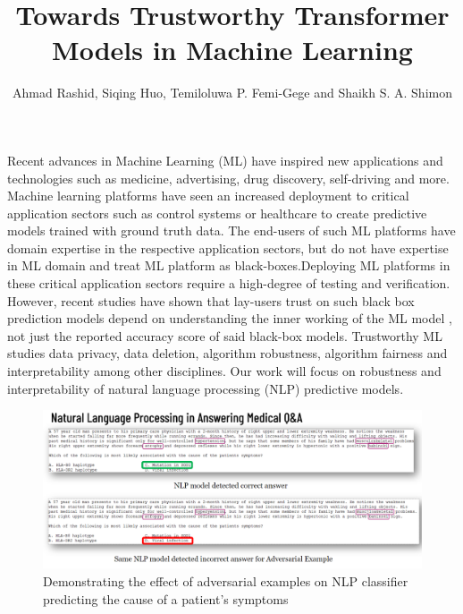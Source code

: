 \documentclass[journal]{vgtc}                %
\title{Towards Trustworthy Transformer Models in Machine Learning}
\author{Ahmad Rashid, Siqing Huo, Temiloluwa P. Femi-Gege and Shaikh S. A. Shimon}
\begin{document}


\maketitle

Recent advances in Machine Learning (ML) have inspired new applications and technologies such as medicine, advertising, drug discovery, self-driving and more. Machine learning platforms have seen an increased deployment to critical application sectors such as control systems or healthcare to create predictive models trained with ground truth data. The end-users of such ML platforms have domain expertise in the respective application sectors, but do not have expertise in ML domain and treat ML platform as black-boxes.Deploying ML platforms in these critical application sectors require a high-degree of testing and verification. However, recent studies have shown that lay-users trust on such black box prediction models depend on understanding the inner working of the ML model\cite{DoshiVelez2017Towards} \cite{DBLP:journals/corr/Lipton16a} \cite{DBLP:journals/corr/RibeiroSG16}, not just the reported accuracy score of said black-box models. Trustworthy ML studies data privacy, data deletion, algorithm robustness, algorithm fairness and interpretability among other disciplines. Our work will focus on robustness and interpretability of  natural language processing (NLP) predictive models.




\begin{figure}[tb]
    \centering
    
    \includegraphics[width=16cm]{figures/adversarialExample.jpg}
    \caption{Demonstrating the effect of adversarial examples on NLP classifier predicting the cause of a patient's symptoms }
    \label{fig:adversarialExample}
    
\end{figure}
\end{document}
